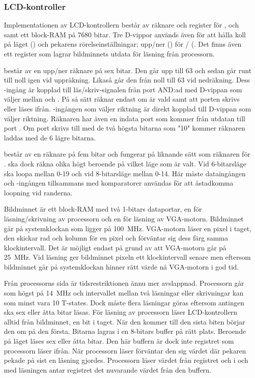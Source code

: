 \documentclass[main.tex]{subfiles}
\begin{document}
\subsubsection{LCD-kontroller}
Implementationen av LCD-kontrollern består av räknare och register för
,  och  samt ett block-RAM på 7680 bitar. Tre D-vippor
används även för att hålla koll på läget () och pekarens
rörelseinställningar; upp/ner () för /
(. Det finns även ett register som lagrar bildminnets utdata för
läsning från processorn.

 består av en upp/ner räknare på sex bitar. Den går upp till 63 och
sedan går runt till noll igen vid uppräkning. Likaså går den från noll till 63
vid nedräkning. Dess -ingång är kopplad till läs/skriv-signalen från
port  AND:ad med D-vippan som väljer mellan  och . På
så sätt räknar  endast om  är vald samt att porten skrivs eller
läses ifrån. -ingången som väljer riktning är direkt kopplad till
D-vippan som väljer riktning. Räknaren har även en indata port som kommer från
utdatan till port . Om port  skrivs till med de två högsta
bitarna som "10" kommer räknaren laddas med de 6 lägre bitarna.

 består av en räknare på fem bitar och fungerar på liknande sätt som
räknaren för .  ska dock räkna olika högt beroende på vilket
läge som är valt. Vid 6-bitarsläge ska  loopa mellan 0-19 och vid
8-bitarsläge mellan 0-14. Här måste dataingången och -ingången
tillsammans med komparatorer användas för att åstadkomma loopning vid randerna.

Bildminnet är ett block-RAM med två 1-bitars dataportar, en för
läsning/skrivning av processorn och en för läsning av VGA-motorn. Bildminnet
går på systemklockan som ligger på \SI{100}{\mega\hertz}. VGA-motorn läser en
pixel i taget, den skickar rad och kolumn för en pixel och förväntar sig dess
färg samma klockintervall. Det är möjligt endast på grund av att VGA-motorn går
på \SI{25}{\mega\hertz}. Vid läsning ger bildminnet pixeln ett klockintervall
senare men eftersom bildminnet går på systemklockan hinner rätt värde nå
VGA-motorn i god tid.

Från processorns sida är tidsrestriktionen ännu mer avslappnad. Processorn går
som högst på \SI{14}{\mega\hertz} och intervallet mellan två läsningar eller
skrivningar kan som minst vara 10 T-states. Dock måste flera läsningar göras
eftersom antingen ska sex eller åtta bitar läsas. För läsning av processorn
läser LCD-kontrollern alltid från bildminnet, en bit i taget. När den kommer
till den sista biten börjar den om på den första. Bitarna lagras i en 8-bitars
buffer på rätt plats. Beroende på läget läses sex eller åtta bitar. Den här
buffern är dock inte registret som processorn läser ifrån. När processorn läser
förväntar den sig värdet där pekaren pekade på sist en läsning gjordes.
Processorn läser värdet från registret och i och med läsningen antar registret
det nuvarande värdet från den buffern.
\end{document}
